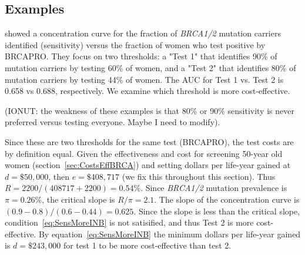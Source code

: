 \documentclass[11pt, letterpaper]{article}
\begin{document}
\subsection{Examples}
\label{sec:90vs80}

\cite{Best2019} showed a concentration curve for the fraction of \textit{BRCA1/2} mutation carriers identified (sensitivity) versus the fraction of women who test positive by BRCAPRO.  They focus on two thresholds: a "Test 1" that identifies 90\% of mutation carriers by testing 60\% of women, and a "Test 2" that identifies 80\% of mutation carriers by testing 44\% of women.  The AUC for Test 1 vs. Test 2 is 0.658 vs 0.688, respectively.  We examine which threshold is more cost-effective.  

(IONUT:  the weakness of these examples is that 80\% or 90\% sensitivity is never preferred versus testing everyone.  Maybe I need to modify).

Since these are two thresholds for the same test (BRCAPRO), the test costs are by definition equal.  Given the effectiveness and cost for screening 50-year old women (section~\ref{sec:CostsEffBRCA}) and setting dollars per life-year gained at $d=\$50,\!000$, then $e=\$408,\!717$ (we fix this throughout this section).  Thus $R=2200/(408717+2200)=0.54\%$.  Since \textit{BRCA1/2} mutation prevalence is $\pi=0.26\%$, the critical slope is $R/\pi=2.1$.  The slope of the concentration curve is $(0.9-0.8)/(0.6-0.44)=0.625$.  Since the slope is less than the critical slope, condition~\ref{eq:SensMoreINB} is not satisified, and thus Test 2 is more cost-effective.  By equation~\ref{eq:SensMoreINB} the minimum dollars per life-year gained is $d=\$243,\!000$ for test 1 to be more cost-effective than test 2.

\end{document}
